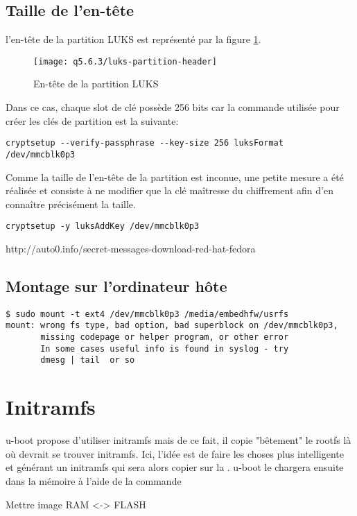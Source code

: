 \subsection{Taille de l'en-tête}
l'en-tête de la partition LUKS est représenté par la figure \ref{fig:luks partition header}.
\begin{figure}
	\centering
	\texttt{[image: q5.6.3/luks-partition-header]}
	\caption{\label{fig:luks partition header}En-tête de la partition LUKS}
\end{figure}
Dans ce cas, chaque slot de clé possède 256 bits car la commande utilisée pour créer les clés de partition est la suivante:
\begin{lstlisting}
cryptsetup --verify-passphrase --key-size 256 luksFormat /dev/mmcblk0p3
\end{lstlisting}

Comme la taille de l'en-tête de la partition est inconue, une petite mesure a été réalisée et consiste à ne modifier que la clé maîtresse du chiffrement afin d'en connaître précisément la taille.
\begin{lstlisting}
cryptsetup -y luksAddKey /dev/mmcblk0p3
\end{lstlisting}
http://auto0.info/secret-messages-download-red-hat-fedora

\subsection{Montage sur l'ordinateur hôte}
\begin{lstlisting}
$ sudo mount -t ext4 /dev/mmcblk0p3 /media/embedhfw/usrfs
mount: wrong fs type, bad option, bad superblock on /dev/mmcblk0p3,
       missing codepage or helper program, or other error
       In some cases useful info is found in syslog - try
       dmesg | tail  or so

\end{lstlisting}

\section{Initramfs}
u-boot propose d'utiliser initramfs mais de ce fait, il copie "bêtement" le rootfs là où devrait se trouver initramfs. Ici, l'idée est de faire les choses plus intelligente et générant un initramfs qui sera alors copier sur la \usd. u-boot le chargera ensuite dans la mémoire à l'aide de la commande

Mettre image RAM <-> FLASH

